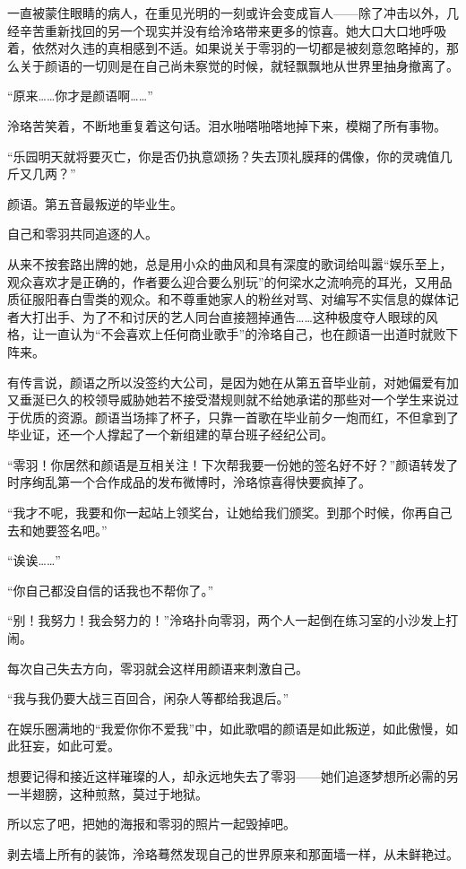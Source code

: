\documentclass[UTF8, scheme = chinese, openany]{ctexbook}
\begin{document}
一直被蒙住眼睛的病人，在重见光明的一刻或许会变成盲人——除了冲击以外，几经辛苦重新找回的另一个现实并没有给泠珞带来更多的惊喜。她大口大口地呼吸着，依然对久违的真相感到不适。如果说关于零羽的一切都是被刻意忽略掉的，那么关于颜语的一切则是在自己尚未察觉的时候，就轻飘飘地从世界里抽身撤离了。

“原来……你才是颜语啊……”

泠珞苦笑着，不断地重复着这句话。泪水啪嗒啪嗒地掉下来，模糊了所有事物。

“乐园明天就将要灭亡，你是否仍执意颂扬？失去顶礼膜拜的偶像，你的灵魂值几斤又几两？”

颜语。第五音最叛逆的毕业生。

自己和零羽共同追逐的人。

从来不按套路出牌的她，总是用小众的曲风和具有深度的歌词给叫嚣“娱乐至上，观众喜欢才是正确的，作者要么迎合要么别玩”的何梁水之流响亮的耳光，又用品质征服阳春白雪类的观众。和不尊重她家人的粉丝对骂、对编写不实信息的媒体记者大打出手、为了不和讨厌的艺人同台直接翘掉通告……这种极度夺人眼球的风格，让一直认为“不会喜欢上任何商业歌手”的泠珞自己，也在颜语一出道时就败下阵来。

有传言说，颜语之所以没签约大公司，是因为她在从第五音毕业前，对她偏爱有加又垂涎已久的校领导威胁她若不接受潜规则就不给她承诺的那些对一个学生来说过于优质的资源。颜语当场摔了杯子，只靠一首歌在毕业前夕一炮而红，不但拿到了毕业证，还一个人撑起了一个新组建的草台班子经纪公司。

“零羽！你居然和颜语是互相关注！下次帮我要一份她的签名好不好？”颜语转发了时序绚乱第一个合作成品的发布微博时，泠珞惊喜得快要疯掉了。

“我才不呢，我要和你一起站上领奖台，让她给我们颁奖。到那个时候，你再自己去和她要签名吧。”

“诶诶……”

“你自己都没自信的话我也不帮你了。”

“别！我努力！我会努力的！”泠珞扑向零羽，两个人一起倒在练习室的小沙发上打闹。

每次自己失去方向，零羽就会这样用颜语来刺激自己。

“我与我仍要大战三百回合，闲杂人等都给我退后。”

在娱乐圈满地的“我爱你你不爱我”中，如此歌唱的颜语是如此叛逆，如此傲慢，如此狂妄，如此可爱。

想要记得和接近这样璀璨的人，却永远地失去了零羽——她们追逐梦想所必需的另一半翅膀，这种煎熬，莫过于地狱。

所以忘了吧，把她的海报和零羽的照片一起毁掉吧。

剥去墙上所有的装饰，泠珞蓦然发现自己的世界原来和那面墙一样，从未鲜艳过。
\end{document}
